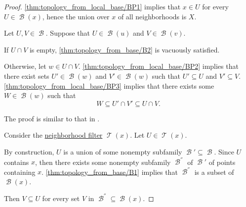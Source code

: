 \begin{proof}

   \ref{thm:topology_from_local_base/BP1} implies that \( x \in U \) for every \( U \in \mscrB(x) \), hence the union over \( x \) of all neighborhoods is \( X \).

   Let \( U, V \in \mscrB \). Suppose that \( U \in \mscrB(u) \) and \( V \in \mscrB(v) \).

  If \( U \cap V \) is empty, \ref{thm:topology_from_base/B2} is vacuously satisfied.

  Otherwise, let \( w \in U \cap V \). \ref{thm:topology_from_local_base/BP2} implies that there exist sets \( U' \in \mscrB(w) \) and \( V' \in \mscrB(w) \) such that \( U' \subseteq U \) and \( V' \subseteq V \). \ref{thm:topology_from_local_base/BP3} implies that there exists some \( W \in \mscrB(w) \) such that
  \begin{equation*}
    W \subseteq U' \cap V' \subseteq U \cap V.
  \end{equation*}

   The proof is similar to that in .

   Consider the \hyperref[def:topological_neighborhood]{neighborhood filter} \( \mscrT(x) \). Let \( U \in \mscrT(x) \).

  By construction, \( U \) is a union of some nonempty subfamily \( \mscrB' \subseteq \mscrB \). Since \( U \) contains \( x \), then there exists some nonempty subfamily \( \mscrB^\dprime \) of \( \mscrB' \) of points containing \( x \). \ref{thm:topology_from_base/B1} implies that \( \mscrB^\dprime \) is a subset of \( \mscrB(x) \).

  Then \( V \subseteq U \) for every set \( V \) in \( \mscrB^\dprime \subseteq \mscrB(x) \).
\end{proof}

